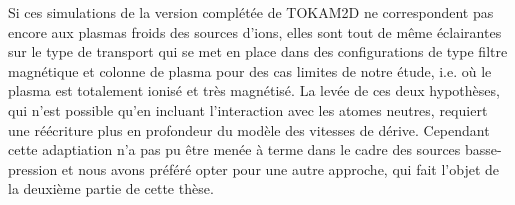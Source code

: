 \begin{refsection}
Si ces simulations de la version complétée de TOKAM2D ne correspondent pas
encore aux plasmas froids des sources d'ions, elles sont tout de même
éclairantes sur le type de transport qui se met en place dans des
configurations de type filtre magnétique et colonne de plasma pour des cas
limites de notre étude, i.e. où le plasma est totalement ionisé et très
magnétisé. La levée de ces deux hypothèses, qui n'est possible qu'en incluant
l'interaction avec les atomes neutres, requiert une réécriture plus en
profondeur du modèle des vitesses de dérive. Cependant cette adaptiation
n'a pas pu être menée à terme dans le cadre des sources basse-pression et nous avons préféré opter pour une autre approche, qui
fait l'objet de la deuxième partie de cette thèse.

%
%

\end{refsection}




